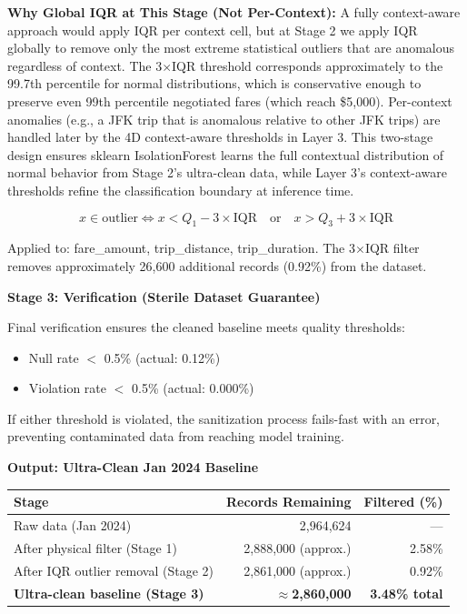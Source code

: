 \textbf{Why Global IQR at This Stage (Not Per-Context):} A fully context-aware approach would apply IQR per context cell, but at Stage 2 we apply IQR globally to remove only the most extreme statistical outliers that are anomalous regardless of context. The 3$\times$IQR threshold corresponds approximately to the 99.7th percentile for normal distributions, which is conservative enough to preserve even 99th percentile negotiated fares (which reach \$5,000). Per-context anomalies (e.g., a JFK trip that is anomalous relative to other JFK trips) are handled later by the 4D context-aware thresholds in Layer 3. This two-stage design ensures sklearn IsolationForest learns the full contextual distribution of normal behavior from Stage 2's ultra-clean data, while Layer 3's context-aware thresholds refine the classification boundary at inference time.

\begin{equation}
x \in \text{outlier} \iff x < Q_1 - 3 \times \mathrm{IQR} \quad \text{or} \quad x > Q_3 + 3 \times \mathrm{IQR}
\end{equation}

Applied to: fare\_amount, trip\_distance, trip\_duration. The 3$\times$IQR filter removes approximately 26,600 additional records (0.92\%) from the dataset.

\textbf{Stage 3: Verification (Sterile Dataset Guarantee)}

Final verification ensures the cleaned baseline meets quality thresholds:

\begin{itemize}
    \item Null rate $<$ 0.5\% (actual: 0.12\%)
    \item Violation rate $<$ 0.5\% (actual: 0.000\%)
\end{itemize}

If either threshold is violated, the sanitization process fails-fast with an error, preventing contaminated data from reaching model training.

\textbf{Output: Ultra-Clean Jan 2024 Baseline}

\begin{center}
\begin{tabular}{|l|r|r|}
\hline
\textbf{Stage} & \textbf{Records Remaining} & \textbf{Filtered (\%)} \\
\hline
Raw data (Jan 2024) & 2,964,624 & --- \\
After physical filter (Stage 1) & 2,888,000 (approx.) & 2.58\% \\
After IQR outlier removal (Stage 2) & 2,861,000 (approx.) & 0.92\% \\
\textbf{Ultra-clean baseline (Stage 3)} & \textbf{$\approx$2,860,000} & \textbf{3.48\% total} \\
\hline
\end{tabular}
\end{center}

